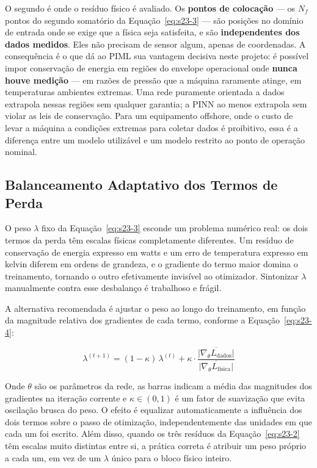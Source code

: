 \documentclass[12pt,a4paper]{article}
\numberwithin{equation}{section}
\numberwithin{table}{section}
\numberwithin{figure}{section}
\begin{document}
{	O segundo é onde o resíduo físico é avaliado. Os \textbf{pontos de colocação} — os $N_f$ pontos do segundo somatório da Equação~\eqref{eq:s23-3} — são posições no domínio de entrada onde se exige que a física seja satisfeita, e são \textbf{independentes dos dados medidos}. Eles não precisam de sensor algum, apenas de coordenadas. A consequência é o que dá ao PIML sua vantagem decisiva neste projeto: é possível impor conservação de energia em regiões do envelope operacional onde \textbf{nunca houve medição} — em razões de pressão que a máquina raramente atinge, em temperaturas ambientes extremas. Uma rede puramente orientada a dados extrapola nessas regiões sem qualquer garantia; a PINN ao menos extrapola sem violar as leis de conservação. Para um equipamento offshore, onde o custo de levar a máquina a condições extremas para coletar dados é proibitivo, essa é a diferença entre um modelo utilizável e um modelo restrito ao ponto de operação nominal.

	\subsection{Balanceamento Adaptativo dos Termos de Perda}

	O peso $\lambda$ fixo da Equação~\eqref{eq:s23-3} esconde um problema numérico real: os dois termos da perda têm escalas físicas completamente diferentes. Um resíduo de conservação de energia expresso em watts e um erro de temperatura expresso em kelvin diferem em ordens de grandeza, e o gradiente do termo maior domina o treinamento, tornando o outro efetivamente invisível ao otimizador. Sintonizar $\lambda$ manualmente contra esse desbalanço é trabalhoso e frágil.

	A alternativa recomendada é ajustar o peso ao longo do treinamento, em função da magnitude relativa dos gradientes de cada termo, conforme a Equação~\eqref{eq:s23-4}:

	\begin{equation}\label{eq:s23-4}
	\lambda^{(t+1)} = (1-\kappa)\,\lambda^{(t)} + \kappa \cdot \frac{\overline{\left| \nabla_\theta L_{\text{dados}} \right|}}{\overline{\left| \nabla_\theta L_{\text{física}} \right|}}
\end{equation}

	Onde $\theta$ são os parâmetros da rede, as barras indicam a média das magnitudes dos gradientes na iteração corrente e $\kappa \in (0,1)$ é um fator de suavização que evita oscilação brusca do peso. O efeito é equalizar automaticamente a influência dos dois termos sobre o passo de otimização, independentemente das unidades em que cada um foi escrito. Além disso, quando os três resíduos da Equação~\eqref{eq:s23-2} têm escalas muito distintas entre si, a prática correta é atribuir um peso próprio a cada um, em vez de um $\lambda$ único para o bloco físico inteiro.

}
\end{document}
